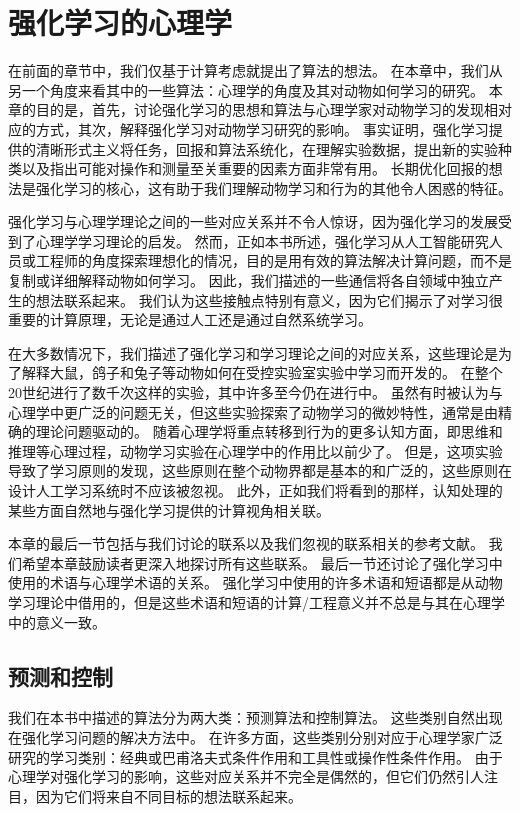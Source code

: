 \chapter{强化学习的心理学} \label{chap:chap11}

在前面的章节中，我们仅基于计算考虑就提出了算法的想法。
在本章中，我们从另一个角度来看其中的一些算法：心理学的角度及其对动物如何学习的研究。
本章的目的是，首先，讨论强化学习的思想和算法与心理学家对动物学习的发现相对应的方式，其次，解释强化学习对动物学习研究的影响。
事实证明，强化学习提供的清晰形式主义将任务，回报和算法系统化，在理解实验数据，提出新的实验种类以及指出可能对操作和测量至关重要的因素方面非常有用。
长期优化回报的想法是强化学习的核心，这有助于我们理解动物学习和行为的其他令人困惑的特征。


强化学习与心理学理论之间的一些对应关系并不令人惊讶，因为强化学习的发展受到了心理学学习理论的启发。
然而，正如本书所述，强化学习从人工智能研究人员或工程师的角度探索理想化的情况，目的是用有效的算法解决计算问题，而不是复制或详细解释动物如何学习。
因此，我们描述的一些通信将各自领域中独立产生的想法联系起来。
我们认为这些接触点特别有意义，因为它们揭示了对学习很重要的计算原理，无论是通过人工还是通过自然系统学习。


在大多数情况下，我们描述了强化学习和学习理论之间的对应关系，这些理论是为了解释大鼠，鸽子和兔子等动物如何在受控实验室实验中学习而开发的。
在整个20世纪进行了数千次这样的实验，其中许多至今仍在进行中。
虽然有时被认为与心理学中更广泛的问题无关，但这些实验探索了动物学习的微妙特性，通常是由精确的理论问题驱动的。
随着心理学将重点转移到行为的更多认知方面，即思维和推理等心理过程，动物学习实验在心理学中的作用比以前少了。
但是，这项实验导致了学习原则的发现，这些原则在整个动物界都是基本的和广泛的，这些原则在设计人工学习系统时不应该被忽视。
此外，正如我们将看到的那样，认知处理的某些方面自然地与强化学习提供的计算视角相关联。


本章的最后一节包括与我们讨论的联系以及我们忽视的联系相关的参考文献。
我们希望本章鼓励读者更深入地探讨所有这些联系。
最后一节还讨论了强化学习中使用的术语与心理学术语的关系。
强化学习中使用的许多术语和短语都是从动物学习理论中借用的，但是这些术语和短语的计算/工程意义并不总是与其在心理学中的意义一致。


\section{预测和控制}


我们在本书中描述的算法分为两大类：预测算法和控制算法。
这些类别自然出现在强化学习问题的解决方法中。
在许多方面，这些类别分别对应于心理学家广泛研究的学习类别：经典或巴甫洛夫式条件作用和工具性或操作性条件作用。
由于心理学对强化学习的影响，这些对应关系并不完全是偶然的，但它们仍然引人注目，因为它们将来自不同目标的想法联系起来。



